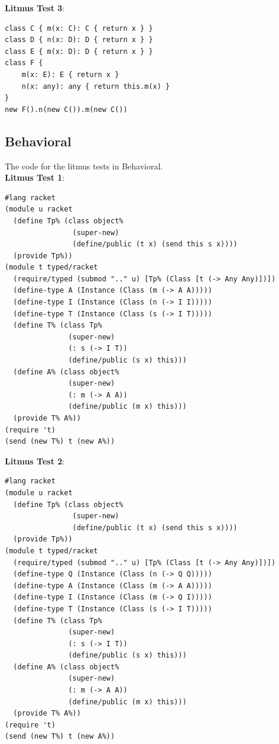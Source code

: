 \documentclass[runnningheads]{tex/llncs}
\begin{document}
\noindent\textbf{Litmus Test 3}:
\begin{verbatim}
class C { m(x: C): C { return x } }
class D { n(x: D): D { return x } }
class E { m(x: D): D { return x } }
class F {
    m(x: E): E { return x }
    n(x: any): any { return this.m(x) }
}
new F().n(new C()).m(new C())
\end{verbatim}

\subsection*{Behavioral}

The code for the litmus tests in Behavioral. \\

\noindent\textbf{Litmus Test 1}:

\begin{verbatim}
#lang racket
(module u racket
  (define Tp% (class object%
                (super-new)
                (define/public (t x) (send this s x))))
  (provide Tp%))
(module t typed/racket
  (require/typed (submod ".." u) [Tp% (Class [t (-> Any Any)])])
  (define-type A (Instance (Class (m (-> A A)))))
  (define-type I (Instance (Class (n (-> I I)))))
  (define-type T (Instance (Class (s (-> I T)))))
  (define T% (class Tp%
               (super-new)
               (: s (-> I T))
               (define/public (s x) this)))
  (define A% (class object%
               (super-new)
               (: m (-> A A))
               (define/public (m x) this)))
  (provide T% A%))
(require 't)
(send (new T%) t (new A%))
\end{verbatim}

\noindent\textbf{Litmus Test 2}:

\begin{verbatim}
#lang racket
(module u racket
  (define Tp% (class object%
                (super-new)
                (define/public (t x) (send this s x))))
  (provide Tp%))
(module t typed/racket
  (require/typed (submod ".." u) [Tp% (Class [t (-> Any Any)])])
  (define-type Q (Instance (Class (n (-> Q Q)))))
  (define-type A (Instance (Class (m (-> A A)))))
  (define-type I (Instance (Class (m (-> Q I)))))
  (define-type T (Instance (Class (s (-> I T)))))
  (define T% (class Tp%
               (super-new)
               (: s (-> I T))
               (define/public (s x) this)))
  (define A% (class object%
               (super-new)
               (: m (-> A A))
               (define/public (m x) this)))
  (provide T% A%))
(require 't)
(send (new T%) t (new A%))
\end{verbatim}
\end{document}
